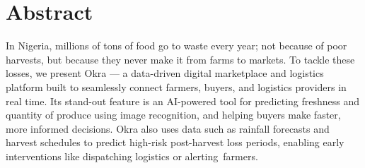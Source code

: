 \thispagestyle{plain}




\chapter*{Abstract}

{In Nigeria, millions of tons of food go to waste every year; not because of poor harvests, but because they never make it from farms to markets. To tackle these losses, we present Okra — a data-driven digital marketplace and logistics platform built to seamlessly connect farmers, buyers, and logistics providers in real time.  Its stand-out feature is an AI-powered tool for predicting freshness and quantity of produce using image recognition, and helping buyers make faster, more informed decisions. Okra also uses data such as rainfall forecasts and harvest schedules to predict high-risk post-harvest loss periods, enabling early interventions like dispatching logistics or alerting farmers.}


\MediaOptionLogicBlank
